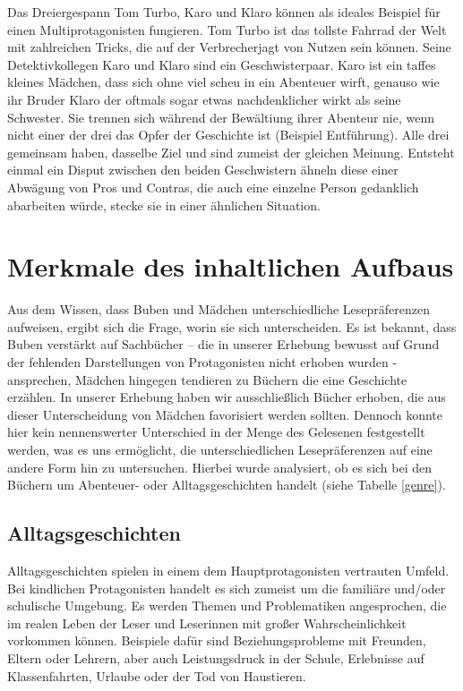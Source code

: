 Das Dreiergespann Tom Turbo, Karo und Klaro können als ideales Beispiel
für einen Multiprotagonisten fungieren. Tom Turbo ist das tollste
Fahrrad der Welt mit zahlreichen Tricks, die auf der Verbrecherjagt von
Nutzen sein können. Seine Detektivkollegen Karo und Klaro sind ein
Geschwisterpaar. Karo ist ein taffes kleines Mädchen, dass sich ohne
viel scheu in ein Abenteuer wirft, genauso wie ihr Bruder Klaro der
oftmals sogar etwas nachdenklicher wirkt als seine Schwester. Sie
trennen sich während der Bewältiung ihrer Abenteur nie, wenn nicht einer
der drei das Opfer der Geschichte ist (Beispiel Entführung). Alle drei
gemeinsam haben, dasselbe Ziel und sind zumeist der gleichen Meinung.
Entsteht einmal ein Disput zwischen den beiden Geschwistern ähneln diese
einer Abwägung von Pros und Contras, die auch eine einzelne Person
gedanklich abarbeiten würde, stecke sie in einer ähnlichen Situation.
\parencite{Brezina2000}

\section{Merkmale des inhaltlichen Aufbaus}

Aus dem Wissen, dass Buben und Mädchen unterschiedliche Lesepräferenzen
aufweisen, ergibt sich die Frage, worin sie sich unterscheiden. Es ist
bekannt, dass Buben verstärkt auf Sachbücher -- die in unserer Erhebung
bewusst auf Grund der fehlenden Darstellungen von Protagonisten nicht
erhoben wurden - ansprechen, Mädchen hingegen tendieren zu Büchern die
eine Geschichte erzählen. In unserer Erhebung haben wir ausschließlich
Bücher erhoben, die aus dieser Unterscheidung von Mädchen favorisiert
werden sollten. Dennoch konnte hier kein nennenswerter Unterschied in
der Menge des Gelesenen festgestellt werden, was es uns ermöglicht, die
unterschiedlichen Lesepräferenzen auf eine andere Form hin zu
untersuchen. Hierbei wurde analysiert, ob es sich bei den Büchern um
Abenteuer- oder Alltagsgeschichten handelt (siehe Tabelle \ref{genre}).



\subsection{Alltagsgeschichten}

Alltagsgeschichten spielen in einem dem Hauptprotagonisten vertrauten
Umfeld. Bei kindlichen Protagonisten handelt es sich zumeist um die
familiäre und/oder schulische Umgebung. Es werden Themen und
Problematiken angesprochen, die im realen Leben der Leser und Leserinnen
mit großer Wahrscheinlichkeit vorkommen können. Beispiele dafür sind
Beziehungsprobleme mit Freunden, Eltern oder Lehrern, aber auch
Leistungsdruck in der Schule, Erlebnisse auf Klassenfahrten, Urlaube
oder der Tod von Haustieren.

